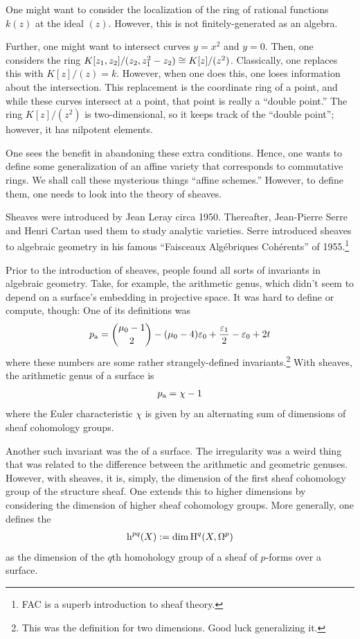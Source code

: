 \documentclass [11 pt, oneside] {article}
\begin{document}
One might want to consider the localization of the ring of rational functions $k(z)$ at the ideal $(z)$. However, this is not finitely-generated as an algebra.

Further, one might want to intersect curves $y=x^2$ and $y=0$. Then, one considers the ring $K[z_1,z_2]/(z_2,z_1^2-z_2) \cong K[z]/ (z^2)$. Classically, one replaces this with $K[z]/(z) = k$. However, when one does this, one loses information about the intersection. This replacement is the coordinate ring of a point, and while these curves intersect at a point, that point is really a ``double point.'' The ring $K[z]/(z^2)$ is two-dimensional, so it keeps track of the ``double point''; however, it has nilpotent elements.

One sees the benefit in abandoning these extra conditions. Hence, one wants to define some generalization of an affine variety that corresponds to commutative rings. We shall call these mysterious things ``affine schemes.'' However, to define them, one needs to look into the theory of sheaves.

Sheaves were introduced by Jean Leray circa 1950. Thereafter, Jean-Pierre Serre and Henri Cartan used them to study analytic varieties. Serre introduced sheaves to algebraic geometry in his famous ``Faisceaux Algébriques Cohérents'' of 1955.\footnote{FAC is a superb introduction to sheaf theory.}

Prior to the introduction of sheaves, people found all sorts of invariants in algebraic geometry. Take, for example, the arithmetic genus, which didn't seem to depend on a surface's embedding in projective space. It was hard to define or compute, though: One of its definitions was
\begin{align*}
	p\textsubscript{a} = \binom{\mu_0-1}{2} - (\mu_0 - 4) \varepsilon_0 + \frac{\varepsilon_1}{2} - \varepsilon_0+2t
\end{align*}
where these numbers are some rather strangely-defined invariants.\footnote{This was the definition for two dimensions. Good luck generalizing it.} With sheaves, the arithmetic genus of a surface is
\begin{align*}
	p\textsubscript{a} = \chi -1
\end{align*}
where the Euler characteristic $\chi$ is given by an alternating sum of dimensions of sheaf cohomology groups.

Another such invariant was the  of a surface. The irregularity was a weird thing that was related to the difference between the arithmetic and geometric genuses. However, with sheaves, it is, simply, the dimension of the first sheaf cohomology group of the structure sheaf. One extends this to higher dimensions by considering the dimension of higher sheaf cohomology groups. More generally, one defines the  
\begin{align*}
	{\operatorname{h}}^{pq}(X) := \dim \operatorname{H}^q(X,\Omega^p) 
\end{align*}
as the dimension of the $q$th homohology group of a sheaf of $p$-forms over a surface.
\end{document}
